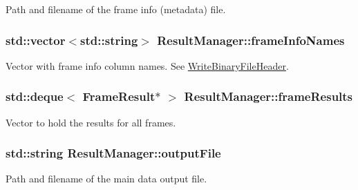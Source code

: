 Path and filename of the frame info (metadata) file. 

\subsubsection[{\texorpdfstring{frame\+Info\+Names}{frameInfoNames}}]{\setlength{\rightskip}{0pt plus 5cm}std\+::vector$<$std\+::string$>$ Result\+Manager\+::frame\+Info\+Names\hspace{0.3cm}{\ttfamily [protected]}}\hypertarget{class_result_manager_a13591c71dc8de59c119c3a26de681e21}{}\label{class_result_manager_a13591c71dc8de59c119c3a26de681e21}


Vector with frame info column names. See \hyperlink{class_result_manager_ad67d6303de94c15cbb8de23cf1837270}{Write\+Binary\+File\+Header}. 

\subsubsection[{\texorpdfstring{frame\+Results}{frameResults}}]{\setlength{\rightskip}{0pt plus 5cm}std\+::deque$<$ {\bf Frame\+Result}$\ast$ $>$ Result\+Manager\+::frame\+Results\hspace{0.3cm}{\ttfamily [protected]}}\hypertarget{class_result_manager_a2b7ba6801c7d9cfff0b4f8ee5ffc7569}{}\label{class_result_manager_a2b7ba6801c7d9cfff0b4f8ee5ffc7569}


Vector to hold the results for all frames. 

\subsubsection[{\texorpdfstring{output\+File}{outputFile}}]{\setlength{\rightskip}{0pt plus 5cm}std\+::string Result\+Manager\+::output\+File\hspace{0.3cm}{\ttfamily [protected]}}\hypertarget{class_result_manager_aa882de00c45911638edda0705fb54f36}{}\label{class_result_manager_aa882de00c45911638edda0705fb54f36}


Path and filename of the main data output file. 


